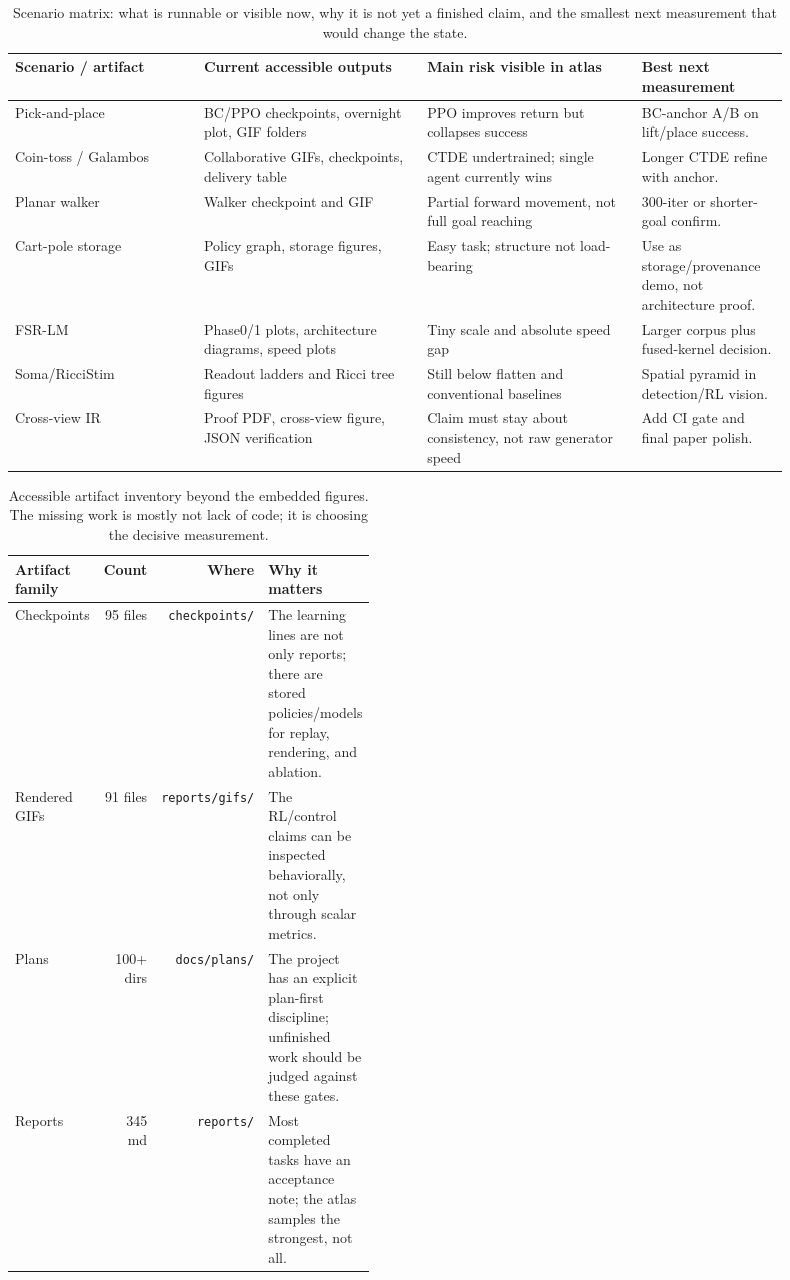 \documentclass[10pt]{article}
\begin{document}
\begin{table}[!htbp]\centering\small
\begin{tabular}{p{0.22\linewidth}p{0.26\linewidth}p{0.25\linewidth}p{0.17\linewidth}}
\toprule
Scenario / artifact & Current accessible outputs & Main risk visible in atlas & Best next measurement \\
\midrule
Pick-and-place & BC/PPO checkpoints, overnight plot, GIF folders & PPO improves
return but collapses success & BC-anchor A/B on lift/place success. \\
Coin-toss / Galambos & Collaborative GIFs, checkpoints, delivery table & CTDE
undertrained; single agent currently wins & Longer CTDE refine with anchor. \\
Planar walker & Walker checkpoint and GIF & Partial forward movement, not full
goal reaching & 300-iter or shorter-goal confirm. \\
Cart-pole storage & Policy graph, storage figures, GIFs & Easy task; structure
not load-bearing & Use as storage/provenance demo, not architecture proof. \\
FSR-LM & Phase0/1 plots, architecture diagrams, speed plots & Tiny scale and
absolute speed gap & Larger corpus plus fused-kernel decision. \\
Soma/RicciStim & Readout ladders and Ricci tree figures & Still below flatten
and conventional baselines & Spatial pyramid in detection/RL vision. \\
Cross-view IR & Proof PDF, cross-view figure, JSON verification & Claim must stay
about consistency, not raw generator speed & Add CI gate and final paper polish. \\
\bottomrule
\end{tabular}
\caption{Scenario matrix: what is runnable or visible now, why it is not yet a
finished claim, and the smallest next measurement that would change the state.}
\end{table}

\begin{table}[!htbp]\centering\small
\begin{tabular}{lrrp{0.42\linewidth}}
\toprule
Artifact family & Count & Where & Why it matters \\
\midrule
Checkpoints & 95 files & \nolinkurl{checkpoints/} & The learning lines are not
only reports; there are stored policies/models for replay, rendering, and
ablation. \\
Rendered GIFs & 91 files & \nolinkurl{reports/gifs/} & The RL/control claims can
be inspected behaviorally, not only through scalar metrics. \\
Plans & 100+ dirs & \nolinkurl{docs/plans/} & The project has an explicit
plan-first discipline; unfinished work should be judged against these gates. \\
Reports & 345 md & \nolinkurl{reports/} & Most completed tasks have an
acceptance note; the atlas samples the strongest, not all. \\
\bottomrule
\end{tabular}
\caption{Accessible artifact inventory beyond the embedded figures. The missing
work is mostly not lack of code; it is choosing the decisive measurement.}
\end{table}
\end{document}
